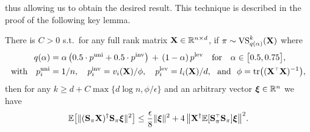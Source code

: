 \documentclass[12pt]{sty/colt2019/colt2018-arxiv}
\begin{document}
    thus allowing us to obtain the desired result. This technique is
    described in the proof  of the following key lemma.
  \begin{lemma}\label{l:key}
  There is $C>0$ s.t.~for any full rank
matrix  $\mathbf X\in\mathbb R^{n\times d}$, if
  $\pi\sim{\mathrm{VS}}_{q(\alpha)}^k(\mathbf X)$ where
  \begin{align*}
 q(\alpha) &=
  \alpha \,\big(0.5\cdot p^{\mathrm{uni}}+0.5\cdot p^{\mathrm{inv}}\big) 
  \,+\,(1-\alpha)\,p^{\mathrm{lev}}  %
  \quad\text{for}\quad \alpha\in\big[0.5,0.75\big],\\
  \text{with}\quad p_i^{\mathrm{uni}}
     &= 1/n,\quad
 p_i^{\mathrm{inv}}= v_i(\X)/\phi,
\quad	p_i^{\mathrm{lev}} = l_i(\X)/d,\ \text{ and }\ \phi=\tr\big((\X^\top\X)^{-1}\big),
  \end{align*}
then for any $k\geq d+ C\max\{ d\log n , \phi/\epsilon\big\}$ and an arbitrary
vector $\boldsymbol\xi\in\mathbb R^n$ we have
\begin{align*}
 \E\big[\|(\S_\pi\X)^\dagger\S_\pi\xib\|^2\big] \leq \frac\epsilon 8
  \|\xib\|^2 +4\, \big\|\X^\dagger\E[\S_\pi^\top\S_\pi]\xib\big\|^2.
\end{align*}
\end{lemma}
\end{document}
